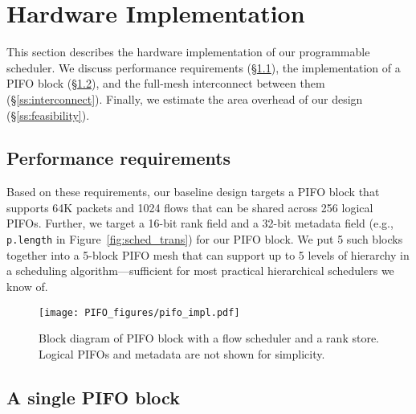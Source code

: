 \section{Hardware Implementation}
\label{s:hardware}
This section describes the hardware implementation of our programmable
scheduler. We discuss performance requirements
(\S\ref{ss:performance}), the implementation of a PIFO block
(\S\ref{ss:single_block}), and the full-mesh interconnect between them
(\S\ref{ss:interconnect}).  Finally, we estimate the area overhead of
our design (\S\ref{ss:feasibility}).

\subsection{Performance requirements}
\label{ss:performance}


 Based on these requirements, our baseline design targets a PIFO block that
supports 64K packets and 1024 flows that can be shared across 256 logical
PIFOs. Further, we target a 16-bit rank field and a 32-bit metadata field
(e.g., {\tt p.length} in Figure~\ref{fig:sched_trans}) for our PIFO block.
We put 5 such blocks together into a 5-block PIFO mesh that can
support up to 5 levels of hierarchy in a scheduling algorithm---sufficient for
most practical hierarchical schedulers we know of.

\begin{figure}[!t]
  \centering
  \texttt{[image: PIFO\_figures/pifo\_impl.pdf]}
  \caption{Block diagram of PIFO block with a flow scheduler and a
   rank store. Logical PIFOs and metadata are not shown for simplicity.}
  \label{fig:pifo_impl}
\end{figure}

\subsection{A single PIFO block}
\label{ss:single_block}

